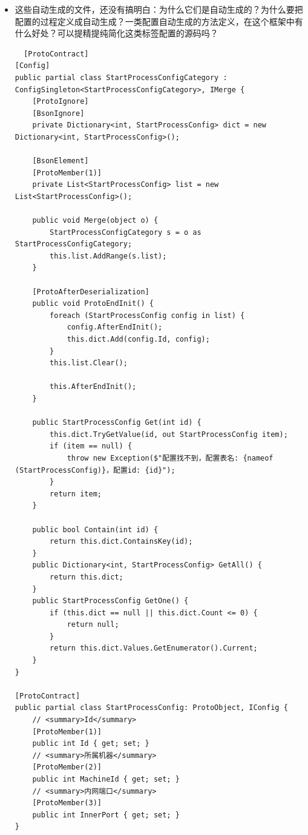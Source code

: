 \documentclass[9pt, b5paper]{article}
\begin{document}
\begin{itemize}
\item 这些自动生成的文件，还没有搞明白：为什么它们是自动生成的？为什么要把配置的过程定义成自动生成？一类配置自动生成的方法定义，在这个框架中有什么好处？可以提精提纯简化这类标签配置的源码吗？
\begin{verbatim}
  [ProtoContract]
[Config]
public partial class StartProcessConfigCategory : ConfigSingleton<StartProcessConfigCategory>, IMerge {
    [ProtoIgnore]
    [BsonIgnore]
    private Dictionary<int, StartProcessConfig> dict = new Dictionary<int, StartProcessConfig>();

    [BsonElement]
    [ProtoMember(1)]
    private List<StartProcessConfig> list = new List<StartProcessConfig>();

    public void Merge(object o) {
        StartProcessConfigCategory s = o as StartProcessConfigCategory;
        this.list.AddRange(s.list);
    }

    [ProtoAfterDeserialization]        
    public void ProtoEndInit() {
        foreach (StartProcessConfig config in list) {
            config.AfterEndInit();
            this.dict.Add(config.Id, config);
        }
        this.list.Clear();

        this.AfterEndInit();
    }

    public StartProcessConfig Get(int id) {
        this.dict.TryGetValue(id, out StartProcessConfig item);
        if (item == null) {
            throw new Exception($"配置找不到，配置表名: {nameof (StartProcessConfig)}，配置id: {id}");
        }
        return item;
    }

    public bool Contain(int id) {
        return this.dict.ContainsKey(id);
    }
    public Dictionary<int, StartProcessConfig> GetAll() {
        return this.dict;
    }
    public StartProcessConfig GetOne() {
        if (this.dict == null || this.dict.Count <= 0) {
            return null;
        }
        return this.dict.Values.GetEnumerator().Current;
    }
}

[ProtoContract]
public partial class StartProcessConfig: ProtoObject, IConfig {
    // <summary>Id</summary>
    [ProtoMember(1)]
    public int Id { get; set; }
    // <summary>所属机器</summary>
    [ProtoMember(2)]
    public int MachineId { get; set; }
    // <summary>内网端口</summary>
    [ProtoMember(3)]
    public int InnerPort { get; set; }
}
\end{verbatim}
\end{itemize}
\end{document}
